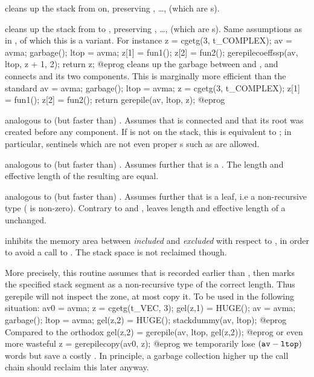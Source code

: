  cleans up the stack
from  on, preserving , \dots,  (which are
s).

cleans up the stack from  to , preserving ,
\dots,  (which are s). Same assumptions as in
, of which this is a variant. For instance
\bprog
  z = cgetg(3, t_COMPLEX);
  av = avma; garbage(); ltop = avma;
  z[1] = fun1();
  z[2] = fun2();
  gerepilecoeffssp(av, ltop, z + 1, 2);
  return z;
@eprog\noindent
cleans up the garbage between  and , and connects 
and its two components. This is marginally more efficient than the standard
\bprog
  av = avma; garbage(); ltop = avma;
  z = cgetg(3, t_COMPLEX);
  z[1] = fun1();
  z[2] = fun2(); return gerepile(av, ltop, z);
@eprog\noindent

 analogous to (but faster than)
. Assumes that  is connected and that its root was
created before any component. If  is not on the stack, this is
equivalent to ; in particular, sentinels which are not even
proper s such as  are allowed.

 analogous to (but faster than)
. Assumes further that  is a . The
length and effective length of the resulting  are equal.

 analogous to (but faster than)
. Assumes further that  is a leaf, i.e a
non-recursive type ( is non-zero). Contrary to
 and ,  leaves
length and effective length of a  unchanged.


 inhibits the memory area
between  \emph{included} and  \emph{excluded} with respect to
, in order to avoid a call to .
The stack space is not reclaimed though.

More precisely, this routine assumes that  is recorded earlier
than , then marks the specified stack segment as a
non-recursive type of the correct length. Thus gerepile will not inspect
the zone, at most copy it. To be used in the following situation:
\bprog
  av0 = avma; z = cgetg(t_VEC, 3);
  gel(z,1) = HUGE(); av = avma; garbage(); ltop = avma;
  gel(z,2) = HUGE(); stackdummy(av, ltop);
@eprog\noindent
Compared to the orthodox
\bprog
  gel(z,2) = gerepile(av, ltop, gel(z,2));
@eprog\noindent
or even more wasteful
\bprog
  z = gerepilecopy(av0, z);
@eprog\noindent
we temporarily lose $({\tt av} - {\tt ltop})$ words but save a costly
. In principle, a garbage collection higher up the call
chain should reclaim this later anyway.

